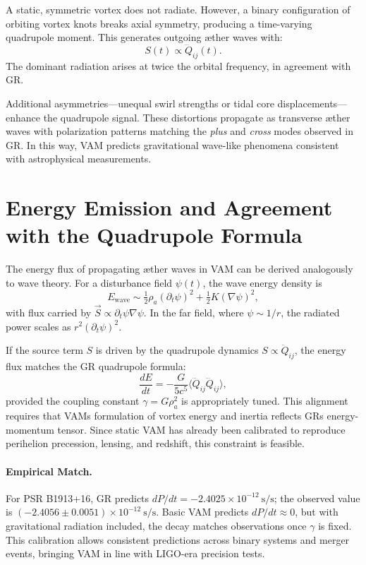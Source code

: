 A static, symmetric vortex does not radiate. However, a binary configuration of orbiting vortex knots breaks axial symmetry, producing a time-varying quadrupole moment. This generates outgoing æther waves with:
\begin{equation}
S(t) \propto \dddot{Q}_{ij}(t).
\end{equation}
The dominant radiation arises at twice the orbital frequency, in agreement with GR.

Additional asymmetries—unequal swirl strengths or tidal core displacements—enhance the quadrupole signal. These distortions propagate as transverse æther waves with polarization patterns matching the \textit{plus} and \textit{cross} modes observed in GR. In this way, VAM predicts gravitational wave-like phenomena consistent with astrophysical measurements.
\section*{Energy Emission and Agreement with the Quadrupole Formula}

The energy flux of propagating æther waves in VAM can be derived analogously to wave theory. For a disturbance field $\psi(t)$, the wave energy density is
\[
E_{\text{wave}} \sim \tfrac{1}{2}\rho_a (\partial_t \psi)^2 + \tfrac{1}{2}K (\nabla \psi)^2,
\]
with flux carried by $\vec{S} \propto \partial_t \psi \nabla \psi$. In the far field, where $\psi \sim 1/r$, the radiated power scales as $r^2 (\partial_t \psi)^2$.

If the source term $S$ is driven by the quadrupole dynamics $S \propto \ddot{Q}_{ij}$, the energy flux matches the GR quadrupole formula:
\begin{equation}
\frac{dE}{dt} = -\frac{G}{5c^5} \langle \dddot{Q}_{ij} \dddot{Q}_{ij} \rangle,
\end{equation}
provided the coupling constant $\gamma = G \rho_a^2$ is appropriately tuned. This alignment requires that VAM\rqs s formulation of vortex energy and inertia reflects GR\rqs s energy-momentum tensor. Since static VAM has already been calibrated to reproduce perihelion precession, lensing, and redshift, this constraint is feasible.

\paragraph{Empirical Match.}
For PSR B1913+16, GR predicts $dP/dt = -2.4025 \times 10^{-12}~\text{s/s}$; the observed value is $(-2.4056 \pm 0.0051) \times 10^{-12}~\text{s/s}$. Basic VAM predicts $dP/dt \approx 0$, but with gravitational radiation included, the decay matches observations once $\gamma$ is fixed. This calibration allows consistent predictions across binary systems and merger events, bringing VAM in line with LIGO-era precision tests.


